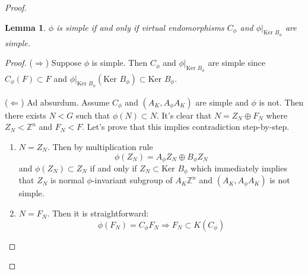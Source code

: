 \documentclass[a4paper,12pt]{amsart}
\newtheorem{lemma}{Lemma}
\theoremstyle{definition}
\newcommand{\Ker}{\text{Ker }}
\begin{document}
\begin{proof}
		\begin{lemma}
			$\phi$ is simple if and only if virtual endomorphisms $C_\phi$ and $\phi|_{\Ker B_\phi}$ are simple.
		\end{lemma}
		\begin{proof}
			($\Rightarrow$) Suppose $\phi$ is simple. Then $C_\phi$ and $\phi|_{\Ker B_\phi}$ are simple since $C_\phi(F) \subset F$ and $\phi|_{\Ker B_\phi}(\Ker B_\phi) \subset \Ker B_\phi$.  
			
			($\Leftarrow$) Ad absurdum. Assume $C_\phi$ and $(A_K, A_\phi A_K)$ are simple and $\phi$ is not. Then there exists $N < G$ such that $\phi(N) \subset N$. It's clear that $N = Z_N \oplus F_N$ where $Z_N < \mathbb{Z}^n$ and $F_N < F$. Let's prove that this implies contradiction step-by-step.  
			
			\begin{enumerate}
				\item \label{prop: N = Z_N} $N = Z_N$. Then by multiplication rule
				$$
				\phi(Z_N) = A_\phi Z_N \oplus B_\phi Z_N 
				$$
				and $\phi(Z_N) \subset Z_N$ if and only if $Z_N \subset \Ker B_\phi$ which immediately implies that $Z_N$ is normal $\phi$-invariant subgroup of $A_K \mathbb{Z}^n$ and $(A_K, A_\phi A_K)$ is not simple. 
				
				\item $N = F_N$. Then it is straightforward: 
				$$
				\phi(F_N) = C_\phi F_N \Rightarrow F_N \subset K(C_\phi)
				$$
				

\end{enumerate}
\end{proof}
\end{proof}
\end{document}
